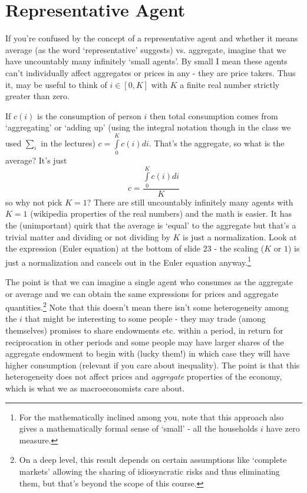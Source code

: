 \documentclass[authoryear,11pt]{elsarticle}
\begin{document}
\section{Representative Agent}
If you're confused by the concept of a representative agent and whether it means average (as the word `representative' suggests) vs. aggregate, imagine that we have uncountably many infinitely `small agents'. By small I mean these agents can't individually affect aggregates or prices in any - they are price takers. Thus it, may be useful to think of $i \in [0,K]$ with $K$ a finite real number strictly greater than zero. 

If $c(i)$ is the consumption of person $i$ then total consumption comes from `aggregating' or `adding up' (using the integral notation though in the class we used $\sum\limits_{i}$ in the lectures) $c = \int\limits_{0}^{K} c(i) di$. That's the aggregate, so what is the average? It's just
\[
c = \frac{\int\limits_{0}^{K} c(i) di}{K}
\]
so why not pick $K=1$? There are still uncountably infinitely many agents with $K=1$ (wikipedia properties of the real numbers) and the math is easier. It has the (unimportant) quirk that the average is `equal' to the aggregate but that's a trivial matter and dividing or not dividing by $K$ is just a normalization. Look at the expression (Euler equation) at the bottom of slide 23 - the scaling ($K$ or $1$) is just a normalization and cancels out in the Euler equation anyway.\footnote{For the mathematically inclined among you, note that this approach also gives a mathematically formal sense of `small' - all the households $i$ have zero measure.}

The point is that we can imagine a single agent who consumes as the aggregate or average and we can obtain the same expressions for prices and aggregate quantities.\footnote{On a deep level, this result depends on certain assumptions like `complete markets' allowing the sharing of idiosyncratic risks and thus eliminating them, but that's beyond the scope of this course.} Note that this doesn't mean there isn't some heterogeneity among the $i$ that might be interesting to some people - they may trade (among themselves) promises to share endowments etc. within a period, in return for reciprocation in other periods and some people may have larger shares of the aggregate endowment to begin with (lucky them!) in which case they will have higher consumption (relevant if you care about inequality). The point is that this heterogeneity does not affect prices and \textit{aggregate} properties of the economy, which is what we as macroeconomists care about.
\end{document}
